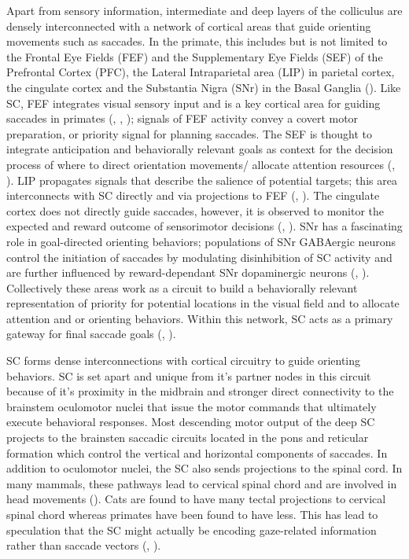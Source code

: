 \documentclass{ar-1col}
\begin{document}
Apart from sensory information, intermediate and deep layers of the colliculus are densely interconnected with a network of cortical areas that guide orienting movements such as saccades. In the primate, this includes but is not limited to the Frontal Eye Fields (FEF) and the Supplementary Eye Fields (SEF) of the Prefrontal Cortex (PFC), the Lateral Intraparietal area (LIP) in parietal cortex, the cingulate cortex and the Substantia Nigra (SNr) in the Basal Ganglia (\cite{platt2003situating}). Like SC, FEF integrates visual sensory input and is a key cortical area for guiding saccades in primates (\cite{hanes2001interaction}, \cite{schall1999neural}, \cite{schall2002neural}); signals of FEF activity convey a covert motor preparation, or priority signal for planning saccades. The SEF is thought to integrate anticipation and behaviorally relevant goals as context for the decision process of where to direct orientation movements/ allocate attention resources (\cite{schall1991neuronal}, \cite{roesch2003impact}). LIP propagates signals that describe the salience of potential targets; this area interconnects with SC directly and via projections to FEF (\cite{gottlieb1998representation}, \cite{goldberg2006saccades}). The cingulate cortex does not directly guide saccades, however, it is observed to monitor the expected and reward outcome of sensorimotor decisions (\cite{carter1998anterior}, \cite{ito2003performance}). SNr has a fascinating role in goal-directed orienting behaviors; populations of SNr GABAergic neurons control the initiation of saccades by modulating disinhibition of SC activity and are further influenced by reward-dependant SNr dopaminergic neurons (\cite{hikosaka2000role}, \cite{hikosaka2007basal}). Collectively these areas work as a circuit to build a behaviorally relevant representation of priority for potential locations in the visual field and to allocate attention and or orienting behaviors. Within this network, SC acts as a primary gateway for final saccade goals (\cite{fecteau2006salience}, \cite{bisley2019neural}).

SC forms dense interconnections with cortical circuitry to guide orienting behaviors. SC is set apart and unique from it's partner nodes in this circuit because of it's proximity in the midbrain and stronger direct connectivity to the brainstem oculomotor nuclei that issue the motor commands that ultimately execute behavioral responses. Most descending motor output of the deep SC projects to the brainsten saccadic circuits located in the pons and reticular formation which control the vertical and horizontal components of saccades. In addition to oculomotor nuclei, the SC also sends projections to the spinal cord. In many mammals, these pathways lead to cervical spinal chord and are involved in head movements (\cite{may2006mammalian}). Cats are found to have many tectal projections to cervical spinal chord whereas primates have been found to have less. This has lead to speculation that the SC might actually be encoding gaze-related information rather than saccade vectors (\cite{freedman1997eye}, \cite{sparks200412}).
\end{document}
